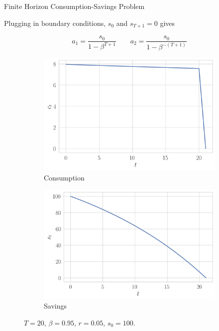 \documentclass[11pt, xcolor={dvipsnames}, hyperref={colorlinks, allcolors=Blue}]{beamer}
\begin{document}
\begin{frame}{Finite Horizon Consumption-Savings Problem}


Plugging in boundary conditions, $s_{0}$ and $s_{T+1} = 0$ gives

\[a_{1} = \frac{s_{0}}{1 - \beta^{T+1}} \qquad a_{2} = \frac{s_{0}}{1 - \beta^{-(T+1)}}\]

\begin{figure}
	\begin{subfigure}[b]{0.45\textwidth}
		\centering
		\includegraphics[width=\textwidth]{FH_consumption.png}	
		\caption{Consumption}
	\end{subfigure}
	\begin{subfigure}[b]{0.45\textwidth}
		\centering
		\includegraphics[width=\textwidth]{FH_savings.png}
		\caption{Savings}
	\end{subfigure}
\caption*{$T=20$, $\beta=0.95$, $r=0.05$, $s_{0}=100$.}
\end{figure}

\end{frame}
\end{document}
